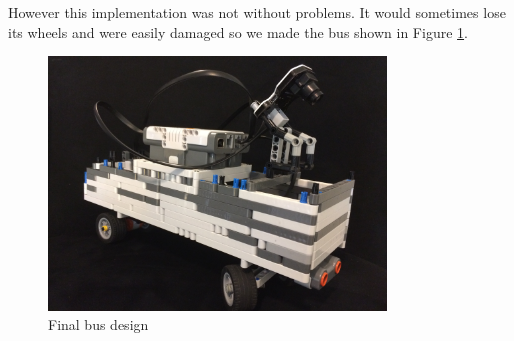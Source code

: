 However this implementation was not without problems. It would sometimes lose its wheels and were easily damaged so we made the bus shown in Figure \ref{CrazyGood}.

\begin{figure}[H]
    \centering
    \includegraphics[width=0.8\textwidth]{Images/implementation/CrazzzyGoodPictureBus.jpg}
    \caption{Final bus design}
    \label{CrazyGood}
\end{figure}
